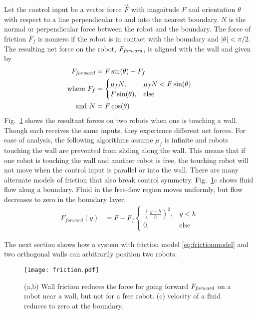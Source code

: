 Let the control input be a vector force $\vec{F}$ with magnitude $F$ and orientation $\theta$ with respect to a line perpendicular to and into the nearest boundary. $N$ is the normal or perpendicular force between the robot and the boundary. The force of friction $F_f$ is nonzero if the robot is in contact with the boundary and  $|\theta| < \pi/2$. The resulting net force on the robot, $F_{\text{\emph{forward}}}$, is aligned with the wall and given by
\begin{align}
F_{\text{\emph{forward}}} &=  F \sin(\theta) - F_f  \nonumber \\
\text{where }  F_f &= \begin{cases}  \mu_f N, &  \mu_f N < F \sin(\theta)  \label{eq:frictionmodel}  \\
F \sin(\theta), & \text{else} \end{cases} \\ %
\text{and } N &= F \cos(\theta) \nonumber
\end{align}
 Fig.~\ref{fig:friction} shows the resultant forces on two robots when one is touching a wall. 
Though each receives the same inputs,  they experience different net forces.
  For ease of analysis, the following algorithms assume $\mu_f$ is infinite and robots touching the wall are prevented from sliding along the wall.
This means that if one robot is touching the wall and another robot is free, the touching robot will not move when the control input is parallel or into the wall. 
There are many alternate models of friction that also break control symmetry. Fig.~\ref{fig:friction}c shows fluid flow along a boundary.  Fluid in the free-flow region moves uniformly, but flow decreases to zero in the boundary layer.  
\begin{align}
F_{forward}(y) &= F - F_f\begin{cases}  \left( \frac{y-h}{h} \right)^2  , &  y<h \label{eq:boundarylayerflow} \\
0, & \text{else} \end{cases}
\end{align}

The next section shows how a system with friction model \eqref{eq:frictionmodel} and two orthogonal walls can arbitrarily position two robots. 
\begin{figure}[h]
\begin{center}
\texttt{[image: friction.pdf]} 
\vspace{-1em}
\caption{(a,b) Wall friction reduces the force for going forward $F_{\text{\emph{forward}}}$ on a robot near a wall, but not for a free robot. (c) velocity of a fluid reduces to zero at the boundary.
\label{fig:friction}
}
\end{center}
\end{figure} 



